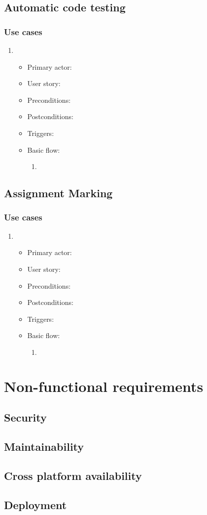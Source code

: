 \subsection{Automatic code testing}
\subsubsection{Use cases}
\begin{enumerate}
\item 
\begin{itemize}
    \item Primary actor:
    \item User story:
    \item Preconditions:
    \item Postconditions:
    \item Triggers:
    \item Basic flow:
        \begin{enumerate}
            \item 
        \end{enumerate}
\end{itemize}
\end{enumerate}

\subsection{Assignment Marking}
\subsubsection{Use cases}
\begin{enumerate}
\item 
\begin{itemize}
    \item Primary actor:
    \item User story:
    \item Preconditions:
    \item Postconditions:
    \item Triggers:
    \item Basic flow:
        \begin{enumerate}
            \item 
        \end{enumerate}
\end{itemize}
\end{enumerate}


\section{Non-functional requirements}
\subsection{Security}
\subsection{Maintainability}
\subsection{Cross platform availability}
\subsection{Deployment}